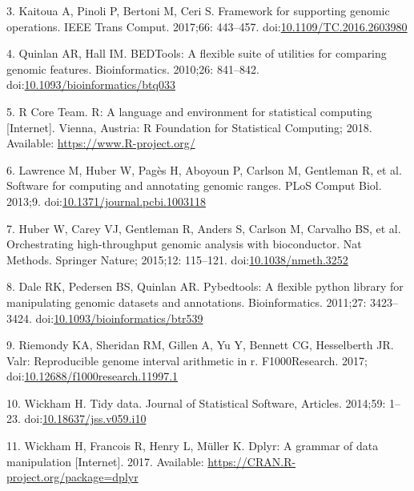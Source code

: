 \documentclass[10pt,letterpaper]{article}
\begin{document}
\leavevmode\hypertarget{ref-Kaitoua2017-pw}{}%
3. Kaitoua A, Pinoli P, Bertoni M, Ceri S. Framework for supporting
genomic operations. IEEE Trans Comput. 2017;66: 443--457.
doi:\href{https://doi.org/10.1109/TC.2016.2603980}{10.1109/TC.2016.2603980}

\leavevmode\hypertarget{ref-Quinlan2010-gc}{}%
4. Quinlan AR, Hall IM. BEDTools: A flexible suite of utilities for
comparing genomic features. Bioinformatics. 2010;26: 841--842.
doi:\href{https://doi.org/10.1093/bioinformatics/btq033}{10.1093/bioinformatics/btq033}

\leavevmode\hypertarget{ref-r-core}{}%
5. R Core Team. R: A language and environment for statistical computing
{[}Internet{]}. Vienna, Austria: R Foundation for Statistical Computing;
2018. Available: \url{https://www.R-project.org/}

\leavevmode\hypertarget{ref-Lawrence2013-wg}{}%
6. Lawrence M, Huber W, Pagès H, Aboyoun P, Carlson M, Gentleman R, et
al. Software for computing and annotating genomic ranges. PLoS Comput
Biol. 2013;9.
doi:\href{https://doi.org/10.1371/journal.pcbi.1003118}{10.1371/journal.pcbi.1003118}

\leavevmode\hypertarget{ref-Huber2015-ei}{}%
7. Huber W, Carey VJ, Gentleman R, Anders S, Carlson M, Carvalho BS, et
al. Orchestrating high-throughput genomic analysis with bioconductor.
Nat Methods. Springer Nature; 2015;12: 115--121.
doi:\href{https://doi.org/10.1038/nmeth.3252}{10.1038/nmeth.3252}

\leavevmode\hypertarget{ref-Dale2011-js}{}%
8. Dale RK, Pedersen BS, Quinlan AR. Pybedtools: A flexible python
library for manipulating genomic datasets and annotations.
Bioinformatics. 2011;27: 3423--3424.
doi:\href{https://doi.org/10.1093/bioinformatics/btr539}{10.1093/bioinformatics/btr539}

\leavevmode\hypertarget{ref-Kent2017}{}%
9. Riemondy KA, Sheridan RM, Gillen A, Yu Y, Bennett CG, Hesselberth JR.
Valr: Reproducible genome interval arithmetic in r. F1000Research. 2017;
doi:\href{https://doi.org/10.12688/f1000research.11997.1}{10.12688/f1000research.11997.1}

\leavevmode\hypertarget{ref-Wickham2014-jc}{}%
10. Wickham H. Tidy data. Journal of Statistical Software, Articles.
2014;59: 1--23.
doi:\href{https://doi.org/10.18637/jss.v059.i10}{10.18637/jss.v059.i10}

\leavevmode\hypertarget{ref-Wickham2017-dplyr}{}%
11. Wickham H, Francois R, Henry L, Müller K. Dplyr: A grammar of data
manipulation {[}Internet{]}. 2017. Available:
\url{https://CRAN.R-project.org/package=dplyr}
\end{document}
